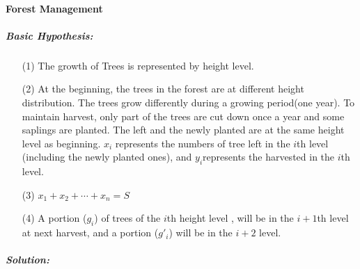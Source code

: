 \documentclass[UTF8]{article}
\begin{document}
\paragraph*{Forest Management}

\subparagraph*{Basic Hypothesis:}
\begin{itemize}
    \item [(1)] The growth of Trees is represented by height level.
    \item [(2)] At the  beginning, the trees in the forest are at different height distribution. The trees grow differently during a growing period(one year). To maintain harvest, only part of the  trees are cut down once a year and some saplings are planted. The left and the newly planted are at the same height level as beginning. $x_i$ represents the numbers of tree left in the $i$th level (including the newly planted ones), and $y_i$represents the harvested in the $i$th level.
    \item [(3)]$x_1+x_2+\cdots+x_n=S$
    \item [(4)]A portion ($g_i$) of trees of the $i$th height level , will be in the $i+1$th level at next harvest, and a portion  ($g'_i$)  will be in the $i+2$ level.
\end{itemize} 

\subparagraph*{Solution:\\}
\end{document}
